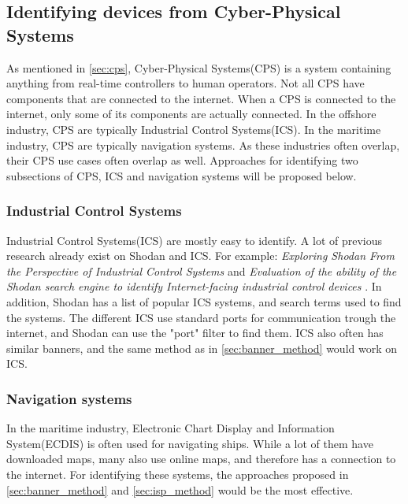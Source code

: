 \subsection{Identifying devices from Cyber-Physical Systems} \label{sec:identify_cps}
As mentioned in \cref{sec:cps}, Cyber-Physical Systems(CPS) is a system containing anything from real-time controllers to human operators. Not all CPS have components that are connected to the internet. When a CPS is connected to the internet, only some of its components are actually connected. In the offshore industry, CPS are typically Industrial Control Systems(ICS). In the maritime industry, CPS are typically navigation systems. As these industries often overlap, their CPS use cases often overlap as well. Approaches for identifying two subsections of CPS, ICS and navigation systems will be proposed below.

\subsubsection{Industrial Control Systems}
Industrial Control Systems(ICS) are mostly easy to identify. A lot of previous research already exist on Shodan and ICS. For example: \textit{Exploring Shodan From the Perspective of Industrial Control Systems}\cite{bodenheim_butts_dunlap_mullins_2014} and \textit{Evaluation of the ability of the Shodan search engine to identify Internet-facing industrial control devices} \cite{ICS_shodan_article}.  In addition, Shodan has a list of popular ICS systems, and search terms used to find the systems.\cite{shodan_ics} The different ICS use standard ports for communication trough the internet, and Shodan can use the "port" filter to find them. ICS also often has similar banners, and the same method as in \cref{sec:banner_method} would work on ICS.

\subsubsection{Navigation systems}
In the maritime industry, Electronic Chart Display and Information System(ECDIS) is often used for navigating ships. While a lot of them have downloaded maps, many also use online maps, and therefore has a connection to the internet. For identifying these systems, the approaches proposed in \cref{sec:banner_method} and \cref{sec:isp_method} would be the most effective.

\newpage
